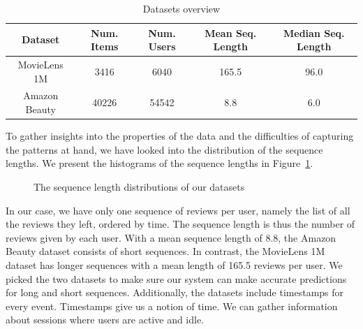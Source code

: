 \begin{table}[htbp]
\centering
 \begin{tabular}{||c c c c c||} 
 \hline
 Dataset & Num. Items & Num. Users & Mean Seq. Length & Median Seq. Length \\ [0.5ex] 
 \hline\hline
  MovieLens 1M & 3416 & 6040 & 165.5 & 96.0\\
 \hline
 Amazon Beauty & 40226 & 54542 & 8.8 & 6.0 \\ 
 \hline
\end{tabular}
\caption{Datasets overview}
\label{tab:datasets}
\end{table}

To gather insights into the properties of the data and the difficulties of capturing the patterns at hand, we have looked into the distribution of the sequence lengths.
We present the histograms of the sequence lengths in Figure~\ref{fig:seq_len_dist}.

\begin{figure}[htbp]
    \centering
    \caption{The sequence length distributions of our datasets}
    \label{fig:seq_len_dist}
\end{figure}

In our case, we have only one sequence of reviews per user, namely the list of all the reviews they left, ordered by time. The sequence length is thus the number of reviews given by each user. With a mean sequence length of 8.8, the Amazon Beauty dataset consists of short sequences. In contrast, the MovieLens 1M dataset has longer sequences with a mean length of 165.5 reviews per user. We picked the two datasets to make sure our system can make accurate predictions for long and short sequences. Additionally, the datasets include timestamps for every event. Timestamps give us a notion of time. We can gather information about sessions where users are active and idle.


